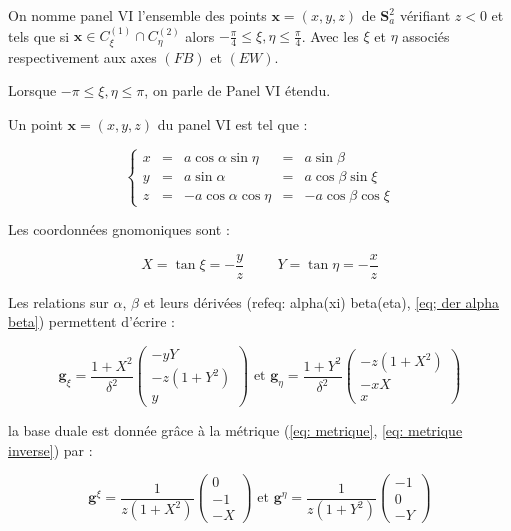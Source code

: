 \begin{definition}
On nomme panel VI l'ensemble des points $\mathbf{x}=(x,y,z)$ de $\mathbf{S}_a^2$ vérifiant $z<0$ et tels que si $\mathbf{x} \in C_{\xi}^{(1)} \cap C_{\eta}^{(2)}$ alors $-\frac{\pi}{4}\leq \xi,\eta \leq \frac{\pi}{4}$. Avec les $\xi$ et $\eta$ associés respectivement aux axes $(FB)$ et $(EW)$.

Lorsque $-\pi \leq \xi,\eta \leq \pi$, on parle de Panel VI étendu.
\end{definition}

Un point $\mathbf{x}=(x,y,z)$ du panel VI est tel que :

\begin{equation}
\left\lbrace
\begin{array}{rcccc}
x & = & a \cos \alpha \sin \eta & = & a \sin \beta \\
y & = & a \sin \alpha & = & a \cos \beta \sin \xi \\
z & = & - a \cos \alpha \cos \eta & = & - a \cos \beta \cos \xi
\end{array}
\right.
\end{equation}

Les coordonnées gnomoniques sont :

\begin{equation}
X = \tan \xi = -\dfrac{y}{z} \hspace{1cm} Y = \tan \eta = -\dfrac{x}{z}
\end{equation}

Les relations sur $\alpha$, $\beta$ et leurs dérivées (ref{eq: alpha(xi) beta(eta)}, \ref{eq; der alpha beta}) permettent d'écrire :

\begin{equation}
\mathbf{g}_{\xi} = \dfrac{1+X^2}{\delta^2} \begin{pmatrix}
-yY \\ -z(1+Y^2) \\ y
\end{pmatrix} \text{ et } \mathbf{g}_{\eta} = \dfrac{1+Y^2}{\delta^2} \begin{pmatrix}
-z(1+X^2) \\ -xX \\ x
\end{pmatrix}
\label{eq: base locale VI}
\end{equation}

la base duale est donnée grâce à la métrique (\ref{eq: metrique}, \ref{eq: metrique inverse}) par :

\begin{equation}
\mathbf{g}^{\xi} = \dfrac{1}{z(1+X^2)}\begin{pmatrix}
0 \\ -1 \\ -X
\end{pmatrix} \text{ et } \mathbf{g}^{\eta} = \dfrac{1}{z(1+Y^2)}\begin{pmatrix}
-1 \\ 0 \\ -Y
\end{pmatrix}
\label{eq: base duale VI}
\end{equation}


